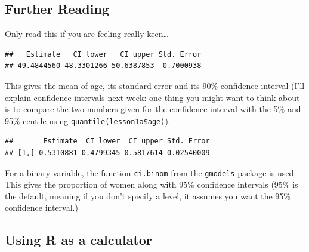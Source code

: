 \documentclass[]{book}
\newenvironment{Shaded}{\begin{snugshade}}{\end{snugshade}}
\newcommand{\CommentTok}[1]{\textcolor[rgb]{0.56,0.35,0.01}{\textit{#1}}}
\newcommand{\DataTypeTok}[1]{\textcolor[rgb]{0.13,0.29,0.53}{#1}}
\newcommand{\FloatTok}[1]{\textcolor[rgb]{0.00,0.00,0.81}{#1}}
\newcommand{\KeywordTok}[1]{\textcolor[rgb]{0.13,0.29,0.53}{\textbf{#1}}}
\newcommand{\NormalTok}[1]{#1}
\newcommand{\OperatorTok}[1]{\textcolor[rgb]{0.81,0.36,0.00}{\textbf{#1}}}
\newcommand{\OtherTok}[1]{\textcolor[rgb]{0.56,0.35,0.01}{#1}}
\begin{document}
\hypertarget{further-reading}{%
\subsection{Further Reading}\label{further-reading}}

Only read this if you are feeling really keen\ldots{}

\begin{Shaded}
\end{Shaded}

\begin{verbatim}
##   Estimate   CI lower   CI upper Std. Error 
## 49.4844560 48.3301266 50.6387853  0.7000938
\end{verbatim}

This gives the mean of age, its standard error and its 90\% confidence
interval (I'll explain confidence intervals next week: one thing you
might want to think about is to compare the two numbers given for the
confidence interval with the 5\% and 95\% centile using
\texttt{quantile(lesson1a\$age)}).

\begin{Shaded}
\end{Shaded}

\begin{verbatim}
##       Estimate  CI lower  CI upper Std. Error
## [1,] 0.5310881 0.4799345 0.5817614 0.02540009
\end{verbatim}

For a binary variable, the function \texttt{ci.binom} from the
\texttt{gmodels} package is used. This gives the proportion of women
along with 95\% confidence intervals (95\% is the default, meaning if
you don't specify a level, it assumes you want the 95\% confidence
interval.)

\hypertarget{using-r-as-a-calculator}{%
\subsection{Using R as a calculator}\label{using-r-as-a-calculator}}
\end{document}
